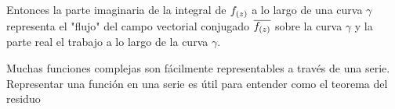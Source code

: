 Entonces la parte imaginaria de la integral de $f_{(z)}$ a lo largo de una curva $\gamma$ representa el "flujo" del campo vectorial conjugado $\overline{f_{(z)}}$ sobre la curva $\gamma$ y la parte real el trabajo a lo largo de la curva $\gamma$.


Muchas funciones complejas son fácilmente representables a través de una serie. Representar una función en una serie es útil para entender como el teorema del residuo
